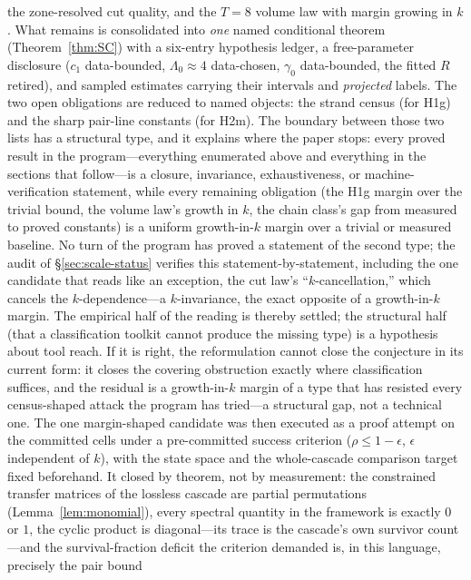 \begin{enumerate}[leftmargin=1.6em,itemsep=2pt]
  the zone-resolved cut quality, and the $T=8$ volume law with margin
  growing in $k$. What remains is consolidated into \emph{one} named
  conditional theorem (Theorem~\ref{thm:SC}) with a six-entry hypothesis
  ledger, a free-parameter disclosure ($c_1$ data-bounded, $\Lambda_0\approx4$
  data-chosen, $\gamma_0$ data-bounded, the fitted $R$ retired), and
  sampled estimates carrying their intervals and \emph{projected} labels.
  The two open obligations are reduced to named objects: the strand
  census (for H1g) and the sharp pair-line constants (for H2m).
  The boundary between those two lists has a structural type, and it
  explains where the paper stops: every proved result in the
  program---everything enumerated above and everything in the sections
  that follow---is a closure, invariance, exhaustiveness, or
  machine-verification statement, while every remaining obligation (the
  H1g margin over the trivial bound, the volume law's growth in $k$, the
  chain class's gap from measured to proved constants) is a uniform
  growth-in-$k$ margin over a trivial or measured baseline. No turn of
  the program has proved a statement of the second type; the audit of
  \S\ref{sec:scale-status} verifies this statement-by-statement,
  including the one candidate that reads like an exception, the cut
  law's ``$k$-cancellation,'' which cancels the $k$-dependence---a
  $k$-invariance, the exact opposite of a growth-in-$k$ margin. The
  empirical half of the reading is thereby settled; the structural half
  (that a classification toolkit cannot produce the missing type) is a
  hypothesis about tool reach. If it is right, the reformulation cannot
  close the conjecture in its current form: it closes the covering
  obstruction exactly where classification suffices, and the residual is
  a growth-in-$k$ margin of a type that has resisted every census-shaped
  attack the program has tried---a structural gap, not a technical one.
  The one margin-shaped candidate was then executed as a proof attempt
  on the committed cells under a pre-committed success criterion
  ($\rho\le 1-\epsilon$, $\epsilon$ independent of $k$), with the state
  space and the whole-cascade comparison target fixed beforehand. It
  closed by theorem, not by measurement: the constrained transfer
  matrices of the lossless cascade are partial permutations
  (Lemma~\ref{lem:monomial}), every spectral quantity in the framework
  is exactly $0$ or $1$, the cyclic product is diagonal---its trace is
  the cascade's own survivor count---and the survival-fraction deficit
  the criterion demanded is, in this language, precisely the pair bound

\end{enumerate}
